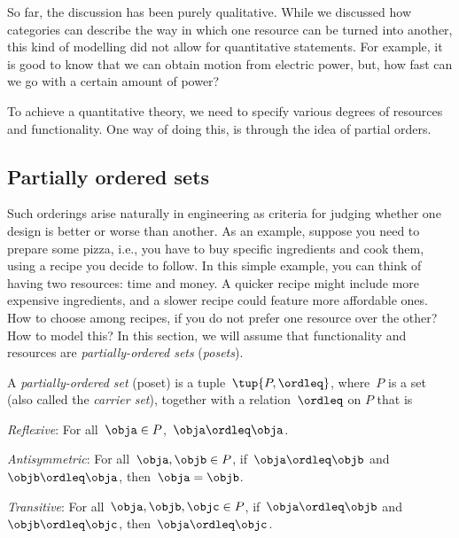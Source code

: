 So far, the discussion has been purely qualitative. While we discussed how
categories can describe the way in which one resource can be turned into another,
this kind of modelling did not allow for quantitative statements. For example, it
is good to know that we can obtain motion from electric power, but, how fast can
we go with a certain amount of power?

To achieve a quantitative theory, we need to specify various degrees of resources and functionality.
One way of doing this, is through the idea of partial orders.

\subsection{Partially ordered sets}
Such orderings arise naturally in engineering as criteria for judging whether one design is better or worse than another. As an example, suppose you need to prepare some pizza, i.e., you have to buy specific ingredients and cook them, using a recipe you decide to follow. In this simple example, you can think of having two resources: time and money. A quicker recipe might include more expensive ingredients, and a slower recipe could feature more affordable ones. How to choose among recipes, if you do not prefer one resource over the other? How to model this? In this section, we will assume that functionality and resources
are \emph{partially-ordered sets} (\emph{posets}).


\begin{definition}
\label{def:poset}
A \emph{partially-ordered set} (poset) is a tuple~$\tup{P, \ordleq}$,
where~$P$ is a set (also called the \emph{carrier set}), together with a
relation~$\ordleq$ on $P$ that is
\begin{compactenum}
    \item \emph{Reflexive}: For all~$\obja\in P$,~$\obja \ordleq \obja$.
    \item \emph{Antisymmetric}: For all~$\obja,\objb\in P$, if~$\obja\ordleq \objb$ and~$\objb\ordleq \obja$, then~$\obja=\objb$.
    \item \emph{Transitive}: For all~$\obja,\objb,\objc\in P$, if~$\obja\ordleq \objb$ and~$\objb\ordleq \objc$, then~$\obja\ordleq \objc$.
\end{compactenum}
\end{definition}

